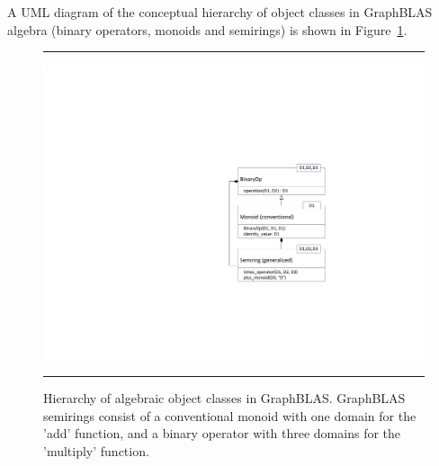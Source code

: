 A UML diagram of the conceptual hierarchy of object classes in GraphBLAS
algebra (binary operators, monoids and semirings) is shown in 
Figure~\ref{Fig:AlgebraHierarchy}.

\begin{figure}[htb]
    \hrule
    \begin{center}
        \includegraphics[width=1.0\linewidth,trim=3in 2in 0.5in 2in]{Algebra_Hierarchy_v2.pdf}
    \end{center}
    \caption{Hierarchy of algebraic object classes in GraphBLAS. GraphBLAS semirings consist of a conventional monoid with one domain for the 'add' function, and a binary operator with three domains for the 'multiply' function.}
    \label{Fig:AlgebraHierarchy}
    \hrule
\end{figure}

